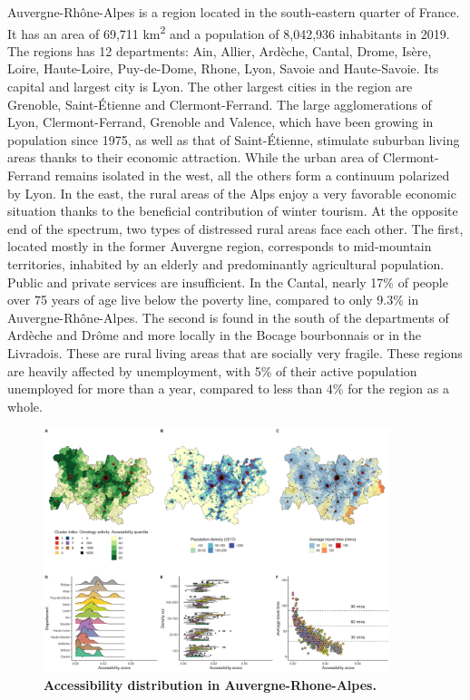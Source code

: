 Auvergne-Rhône-Alpes is a region located in the south-eastern quarter of France. It has an area of 69,711 km\textsuperscript{2} and a population of 8,042,936 inhabitants in 2019. The regions has 12 departments: Ain, Allier, Ardèche, Cantal, Drome, Isère, Loire, Haute-Loire, Puy-de-Dome, Rhone, Lyon, Savoie and Haute-Savoie. Its capital and largest city is Lyon. The other largest cities in the region are Grenoble, Saint-Étienne and Clermont-Ferrand. The large agglomerations of Lyon, Clermont-Ferrand, Grenoble and Valence, which have been growing in population since 1975, as well as that of Saint-Étienne, stimulate suburban living areas thanks to their economic attraction. While the urban area of Clermont-Ferrand remains isolated in the west, all the others form a continuum polarized by Lyon. In the east, the rural areas of the Alps enjoy a very favorable economic situation thanks to the beneficial contribution of winter tourism. At the opposite end of the spectrum, two types of distressed rural areas face each other. The first, located mostly in the former Auvergne region, corresponds to mid-mountain territories, inhabited by an elderly and predominantly agricultural population. Public and private services are insufficient. In the Cantal, nearly 17\% of people over 75 years of age live below the poverty line, compared to only 9.3\% in Auvergne-Rhône-Alpes. The second is found in the south of the departments of Ardèche and Drôme and more locally in the Bocage bourbonnais or in the Livradois. These are rural living areas that are socially very fragile. These regions are heavily affected by unemployment, with 5\% of their active population unemployed for more than a year, compared to less than 4\% for the region as a whole.

\begin{figure}[H]
    \includegraphics[width=0.9\textwidth]{images/camion/region_accessibility/accessibility_Auvergne-Rhone-Alpes.png}
    \centering
    \caption{
        \textbf{Accessibility distribution in Auvergne-Rhone-Alpes.}
    }
\end{figure}

